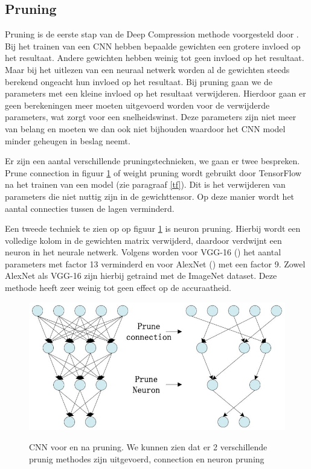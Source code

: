 \subsection{Pruning}
Pruning is de eerste stap van de Deep Compression methode voorgesteld door \cite{han_deep_2016}.
Bij het trainen van een CNN hebben bepaalde gewichten een grotere invloed op het resultaat.
Andere gewichten hebben weinig tot geen invloed op het resultaat.
Maar bij het uitlezen van een neuraal netwerk worden al de gewichten steeds berekend ongeacht hun invloed op het resultaat.
Bij pruning gaan we de parameters met een kleine invloed op het resultaat verwijderen.
Hierdoor gaan er geen berekeningen meer moeten uitgevoerd worden voor de verwijderde parameters, wat zorgt voor een snelheidswinst.
Deze parameters zijn niet meer van belang en moeten we dan ook niet bijhouden waardoor het CNN model minder geheugen in beslag neemt.

Er zijn een aantal verschillende pruningstechnieken, we gaan er twee bespreken.
Prune connection in figuur \ref{fig:pruning} of weight pruning wordt gebruikt door TensorFlow na het trainen van een model (zie paragraaf \ref{tf}).
Dit is het verwijderen van parameters die niet nuttig zijn in de gewichttensor.
Op deze manier wordt het aantal connecties tussen de lagen verminderd.

Een tweede techniek te zien op op figuur \ref{fig:pruning} is neuron pruning.
Hierbij wordt een volledige kolom in de gewichten matrix verwijderd, daardoor verdwijnt een neuron in het neurale netwerk. 
Volgens \cite{han_deep_2016} worden voor VGG-16 (\cite{simonyan2015deep}) het aantal parameters met factor 13 verminderd en voor AlexNet (\cite{Krizhevsky_act_2017}) met een factor 9.
Zowel AlexNet als VGG-16 zijn hierbij getraind met de ImageNet dataset.
Deze methode heeft zeer weinig tot geen effect op de accuraatheid.

\begin{figure}[!ht]
	\centering
	\includegraphics[width=0.6\linewidth]{fig/pruning.jpg}
	\caption{CNN voor en na pruning. We kunnen zien dat er 2 verschillende prunig methodes zijn uitgevoerd, connection en neuron pruning}
	\label{fig:pruning}
	\cite{Lance_pruning_2017}
\end{figure}

